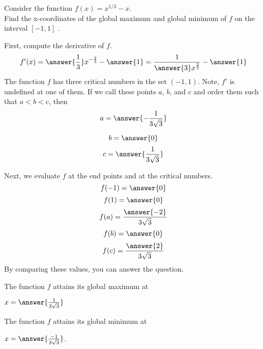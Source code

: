 \documentclass{ximera}
\author{ Nela Lakos}
\begin{document}
\begin{exercise}

Consider the function $f(x) =x^{1/3}-x$. \\
Find the x-coordinates of the global maximum and global minimum of $f$ on the interval $ [-1,1]$ .
\begin{hint}
First, compute the derivative of $f$.
$$
f'(x) = \answer{\frac{1}{3}}x^{-\frac{2}{3}}-\answer{1}=\frac{1}{\answer{3}x^{\frac{2}{3}}}-\answer{1}
$$
The function $f$ has three critical numbers in the set $(-1,1)$. Note, $f'$ is undefined at one of them.
 If we call these points $a$, $b$, and $c$ and order them such
that $a < b<c $, then
$$
a = \answer{-\frac{1}{3\sqrt{3}}}
$$

$$
b=\answer{0}
$$
$$
c=\answer{\frac{1}{3\sqrt{3}}}
$$
\end {hint}

\begin{hint}

Next, we evaluate $f$ at the end points and at the critical numbers.
$$
f(-1) = \answer{0}
$$
$$
f(1)=\answer{0}
$$
$$
f(a)=\frac{\answer{-2}}{3\sqrt{3}}
$$
$$
f(b)=\answer{0}
$$
$$
f(c)=\frac{\answer{2}}{3\sqrt{3}}
$$
By comparing these values, you can answer the question.
\end {hint}

The function $f$ attains its global maximum at	
\begin{prompt}
$x=\answer{\frac{1}{3\sqrt{3}}}$
\end{prompt}
The function $f$ attains its global minimum at	
\begin{prompt}
$x=\answer{\frac{-1}{3\sqrt{3}}}$.
\end{prompt}
\end{exercise}
\end{document}
